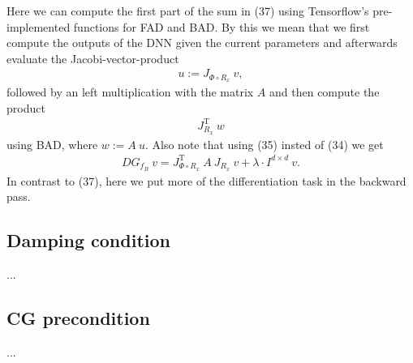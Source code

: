 \documentclass[conference]{IEEEtran}
\begin{document}
Here we can compute the first part of the sum in (37) using Tensorflow's pre-implemented functions for FAD and BAD. By this we mean that we first compute the outputs of the DNN given the current parameters and afterwards evaluate the Jacobi-vector-product 
\begin{align}
u := J_{\Phi\circ R _{x}}\:v,
\end{align}
followed by an left multiplication with the matrix $A$ and then compute the product 
\begin{align}
J_{R_{x}}^{\mathrm{T}}\:w
\end{align}
using BAD, where $w := A\:u$. Also note that using (35) insted of (34) we get 
\begin{align}
DG_{f_{B}}\:v  = J_{\Phi\circ R _{x}}^{\mathrm{T}}\:A\:J_{R _{x}}\:v + \lambda\cdot I^{d\times d}\:v.
\end{align}
In contrast to (37), here we put more of the differentiation task in the backward pass. 


\subsection{Damping condition}
...

\subsection{CG precondition}
...
\end{document}

